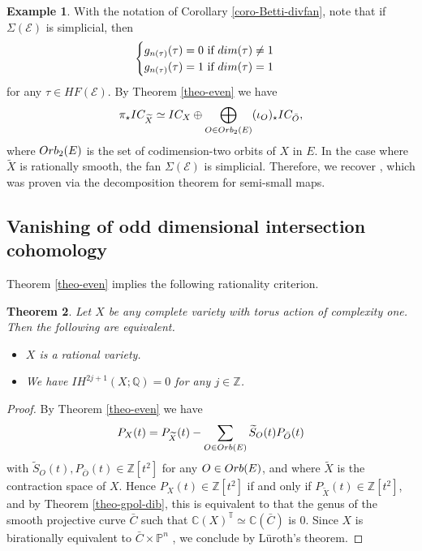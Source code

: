 \documentclass[11pt, reqno]{amsart}
\theoremstyle{plain}
\newtheorem{theorem}{Theorem}[section]
\theoremstyle{definition}
\newtheorem{example}[theorem]{Example}
\theoremstyle{remark}
\begin{document}
\begin{example}
With the notation of Corollary \ref{coro-Betti-divfan}, note that if $\Sigma(\mathscr{E})$ is simplicial, then 
$$\begin{cases} g_{n(\tau)}(\tau) =  0\text{  if } {\rm dim}(\tau)\neq 1\\   g_{n(\tau)}(\tau) =  1 \text{ if } {\rm dim}(\tau)= 1  \end{cases}$$
for any $\tau\in HF(\mathscr{E})$. 
By Theorem \ref{theo-even} we have 
$$\pi_{\star}IC_{\widetilde{X}}\simeq IC_{X}\oplus \bigoplus_{O\in{\rm Orb}_{2}(E)} (\iota_{O})_{\star}IC_{\bar{O}},$$
where ${\rm Orb}_{2}(E)$ is the set of codimension-two orbits of $X$ in $E$. In the case where $\widetilde{X}$ is rationally smooth, the
fan $\Sigma(\mathscr{E})$ is simplicial. Therefore, we recover \cite[Theorem 1.1(iii)]{AL21}, which was proven via the decomposition theorem for semi-small maps. 
\end{example}

\subsection{Vanishing of odd dimensional intersection cohomology}
Theorem \ref{theo-even} implies the following  rationality criterion.
\begin{theorem}\label{theo-rat-imp-coho}
Let $X$ be any complete variety with torus action of complexity one. Then the following 
are equivalent.
\begin{itemize}
\item[(i)] $X$ is a rational variety.
\item[(ii)] We have $IH^{2j+1}(X; \mathbb{Q}) =  0$ for any $j\in\mathbb{Z}$. 
\end{itemize}
\end{theorem}
\begin{proof}
By Theorem \ref{theo-even} we have 
$$P_{X}(t) =  P_{\widetilde{X}}(t) -  \sum_{O\in{\rm Orb}(E)}\widetilde{S}_{O}(t)P_{\bar{O}}(t)$$
with $\widetilde{S}_{O}(t), P_{\bar{O}}(t)\in\mathbb{Z}[t^{2}]$ for any $O\in{\rm Orb}(E)$, and where $\widetilde{X}$ is the contraction space of $X$. Hence $P_{X}(t)\in\mathbb{Z}[t^{2}]$ if and only if $P_{\widetilde{X}}(t)\in\mathbb{Z}[t^{2}]$, and
by Theorem \ref{theo-gpol-dib}, this is equivalent to that the genus of the smooth projective curve $\bar{C}$ such that $\mathbb{C}(X)^{\mathbb{T}}\simeq \mathbb{C}(\bar{C})$ is $0$. Since $X$ is birationally equivalent to $\bar{C}\times \mathbb{P}^{n}$ \cite[Section 1, Corollary 3]{Tim08}, we conclude by L\"uroth's theorem. 
\end{proof}
\end{document}
